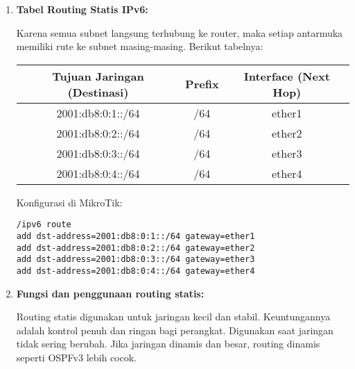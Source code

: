 \begin{enumerate}
    \item \textbf{Tabel Routing Statis IPv6:}

Karena semua subnet langsung terhubung ke router, maka setiap antarmuka memiliki rute ke subnet masing-masing. Berikut tabelnya:

\begin{center}
\begin{tabular}{|c|c|c|}
\hline
\textbf{Tujuan Jaringan (Destinasi)} & \textbf{Prefix} & \textbf{Interface (Next Hop)} \\
\hline
2001:db8:0:1::/64 & /64 & ether1 \\
2001:db8:0:2::/64 & /64 & ether2 \\
2001:db8:0:3::/64 & /64 & ether3 \\
2001:db8:0:4::/64 & /64 & ether4 \\
\hline
\end{tabular}
\end{center}

Konfigurasi di MikroTik:
\begin{verbatim}
/ipv6 route
add dst-address=2001:db8:0:1::/64 gateway=ether1
add dst-address=2001:db8:0:2::/64 gateway=ether2
add dst-address=2001:db8:0:3::/64 gateway=ether3
add dst-address=2001:db8:0:4::/64 gateway=ether4
\end{verbatim}


    \item \textbf{Fungsi dan penggunaan routing statis:}

    Routing statis digunakan untuk jaringan kecil dan stabil. Keuntungannya adalah kontrol penuh dan ringan bagi perangkat. Digunakan saat jaringan tidak sering berubah. Jika jaringan dinamis dan besar, routing dinamis seperti OSPFv3 lebih cocok.
\end{enumerate}
